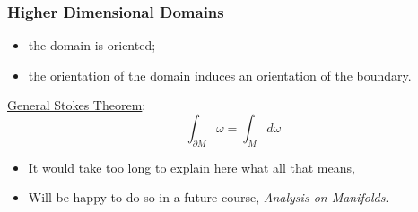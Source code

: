 \begin{frame}
\frametitle{Higher Dimensional Domains}

 \begin{center}
 \end{center}

\begin{itemize}
  \item the domain is oriented;
  \item the orientation of the domain induces an orientation of the boundary.
\end{itemize}



\underline{General Stokes Theorem}:
%
$$\boxed{\int_{\partial M} \omega = \int_M d\omega}$$
%

\begin{itemize}
  \item It would take too long to explain here what all that means,
  \item Will be happy to do so in a future course, \emph{Analysis on Manifolds}.
\end{itemize}

\end{frame}






